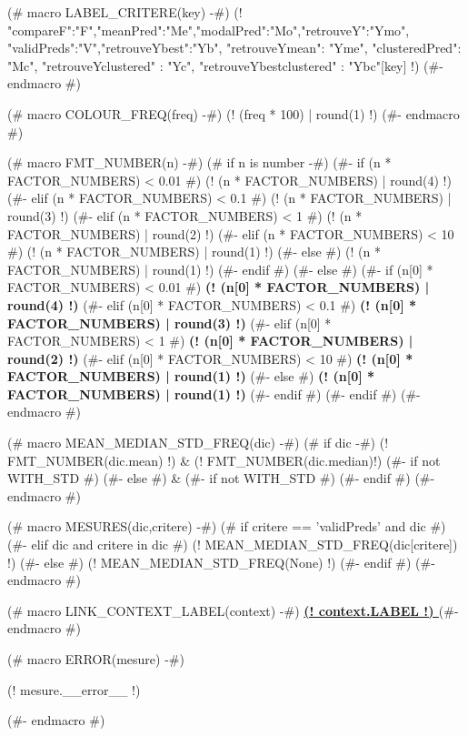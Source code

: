 (# macro LABEL_CRITERE(key) -#)
{\small (! {"compareF":"F","meanPred":"Me","modalPred":"Mo","retrouveY":"Ymo",
"validPreds":"V","retrouveYbest":"Yb", "retrouveYmean": "Yme", "clusteredPred": "Mc",
"retrouveYclustered" : "Yc", "retrouveYbestclustered" : "Ybc"}[key] !)  }
(#- endmacro #)

(# macro COLOUR_FREQ(freq) -#)
\textcolor[rgb]{ (! (2 * (1.1 - freq))  | round(3) | truncate01 !) , (! (2 * freq - 1.3) | round(3) | truncate01 !) , 0.1}{(! (freq * 100) | round(1) !)}
(#- endmacro #)

(# macro FMT_NUMBER(n) -#)
(# if n is number -#)
(#- if (n  * FACTOR_NUMBERS) < 0.01 #)
(! (n  * FACTOR_NUMBERS) | round(4) !)
(#- elif (n  * FACTOR_NUMBERS) < 0.1 #)
(! (n  * FACTOR_NUMBERS) | round(3) !)
(#- elif (n  * FACTOR_NUMBERS) < 1 #)
(! (n  * FACTOR_NUMBERS) | round(2) !)
(#- elif (n  * FACTOR_NUMBERS) < 10 #)
(! (n  * FACTOR_NUMBERS) | round(1) !)
(#- else #)
(! (n  * FACTOR_NUMBERS) | round(1) !)
(#- endif #)
(#- else #)
(#- if (n[0] * FACTOR_NUMBERS) < 0.01 #)
\textbf{ (! (n[0] * FACTOR_NUMBERS) | round(4) !)}
(#- elif (n[0] * FACTOR_NUMBERS) < 0.1 #)
\textbf{ (! (n[0] * FACTOR_NUMBERS) | round(3) !)}
(#- elif (n[0] * FACTOR_NUMBERS) < 1 #)
\textbf{ (! (n[0] * FACTOR_NUMBERS) | round(2) !)}
(#- elif (n[0] * FACTOR_NUMBERS) < 10 #)
\textbf{ (! (n[0] * FACTOR_NUMBERS) | round(1) !)}
(#- else #)
\textbf{ (! (n[0] * FACTOR_NUMBERS) | round(1) !)}
(#- endif #)
(#- endif #)
(#- endmacro #)


(# macro MEAN_MEDIAN_STD_FREQ(dic) -#)
(# if dic -#)
(! FMT_NUMBER(dic.mean) !) & {\footnotesize (! FMT_NUMBER(dic.median)!) } (#- if not WITH_STD #) %
(#- else #)
& (#- if not WITH_STD #) %
(#- endif #)
(#- endmacro #)


(# macro MESURES(dic,critere) -#)
(# if critere == 'validPreds' and dic #)
(#- elif dic and critere in dic #)
    (!  MEAN_MEDIAN_STD_FREQ(dic[critere]) !)
(#- else #)
(! MEAN_MEDIAN_STD_FREQ(None) !)
(#- endif #)
(#- endmacro #)


(# macro LINK_CONTEXT_LABEL(context) -#)
\textbf{ \hyperref[contexts]{ (! context.LABEL !) }}
(#- endmacro #)

(# macro ERROR(mesure) -#)
\begin{minipage}{0.1\columnwidth}
    (! mesure.__error__ !)
\end{minipage}
(#- endmacro #)
